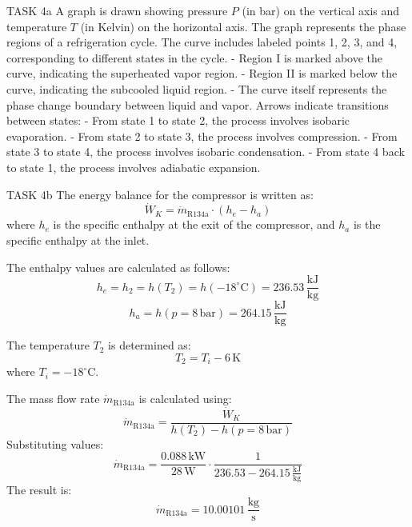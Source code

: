 TASK 4a  
A graph is drawn showing pressure \( P \) (in bar) on the vertical axis and temperature \( T \) (in Kelvin) on the horizontal axis. The graph represents the phase regions of a refrigeration cycle. The curve includes labeled points 1, 2, 3, and 4, corresponding to different states in the cycle.  
- Region I is marked above the curve, indicating the superheated vapor region.  
- Region II is marked below the curve, indicating the subcooled liquid region.  
- The curve itself represents the phase change boundary between liquid and vapor.  
Arrows indicate transitions between states:  
- From state 1 to state 2, the process involves isobaric evaporation.  
- From state 2 to state 3, the process involves compression.  
- From state 3 to state 4, the process involves isobaric condensation.  
- From state 4 back to state 1, the process involves adiabatic expansion.  

TASK 4b  
The energy balance for the compressor is written as:  
\[
\dot{W}_K = \dot{m}_{\text{R134a}} \cdot (h_e - h_a)
\]  
where \( h_e \) is the specific enthalpy at the exit of the compressor, and \( h_a \) is the specific enthalpy at the inlet.  

The enthalpy values are calculated as follows:  
\[
h_e = h_2 = h(T_2) = h(-18^\circ\text{C}) = 236.53 \, \frac{\text{kJ}}{\text{kg}}
\]  
\[
h_a = h(p = 8 \, \text{bar}) = 264.15 \, \frac{\text{kJ}}{\text{kg}}
\]  

The temperature \( T_2 \) is determined as:  
\[
T_2 = T_i - 6 \, \text{K}
\]  
where \( T_i = -18^\circ\text{C} \).  

The mass flow rate \( \dot{m}_{\text{R134a}} \) is calculated using:  
\[
\dot{m}_{\text{R134a}} = \frac{\dot{W}_K}{h(T_2) - h(p = 8 \, \text{bar})}
\]  
Substituting values:  
\[
\dot{m}_{\text{R134a}} = \frac{0.088 \, \text{kW}}{28 \, \text{W}} \cdot \frac{1}{236.53 - 264.15 \, \frac{\text{kJ}}{\text{kg}}}
\]  
The result is:  
\[
\dot{m}_{\text{R134a}} = 10.00101 \, \frac{\text{kg}}{\text{s}}
\]